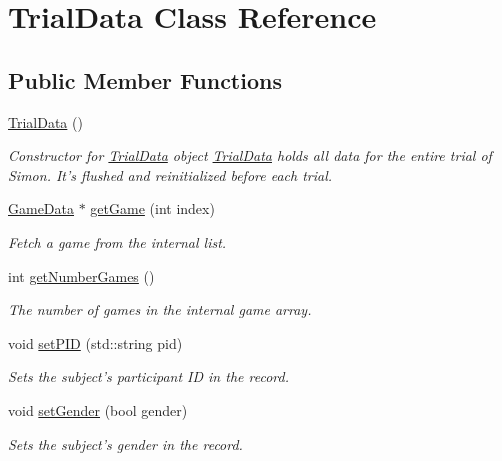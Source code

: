 \hypertarget{class_trial_data}{\section{Trial\+Data Class Reference}
\label{class_trial_data}
}
\subsection*{Public Member Functions}
\begin{DoxyCompactItemize}
\item 
\hypertarget{class_trial_data_ab61aef92abe489ef01ad048417d357af}{\hyperlink{class_trial_data_ab61aef92abe489ef01ad048417d357af}{Trial\+Data} ()}\label{class_trial_data_ab61aef92abe489ef01ad048417d357af}

\begin{DoxyCompactList}\small\item\em Constructor for \hyperlink{class_trial_data}{Trial\+Data} object \hyperlink{class_trial_data}{Trial\+Data} holds all data for the entire trial of Simon. It's flushed and reinitialized before each trial. \end{DoxyCompactList}\item 
\hyperlink{class_game_data}{Game\+Data} $\ast$ \hyperlink{class_trial_data_ab82ebe277cd6251973fa9efdd09b063d}{get\+Game} (int index)
\begin{DoxyCompactList}\small\item\em Fetch a game from the internal list. \end{DoxyCompactList}\item 
int \hyperlink{class_trial_data_aa66d11b4deef49c0abb14b13047663a9}{get\+Number\+Games} ()
\begin{DoxyCompactList}\small\item\em The number of games in the internal game array. \end{DoxyCompactList}\item 
void \hyperlink{class_trial_data_a813986c375dabdbf0efa382213604e84}{set\+P\+I\+D} (std\+::string pid)
\begin{DoxyCompactList}\small\item\em Sets the subject's participant I\+D in the record. \end{DoxyCompactList}\item 
void \hyperlink{class_trial_data_accfa4cd37e47a847562793831e7db5a7}{set\+Gender} (bool gender)
\begin{DoxyCompactList}\small\item\em Sets the subject's gender in the record. \end{DoxyCompactList}\item 

\end{DoxyCompactItemize}

